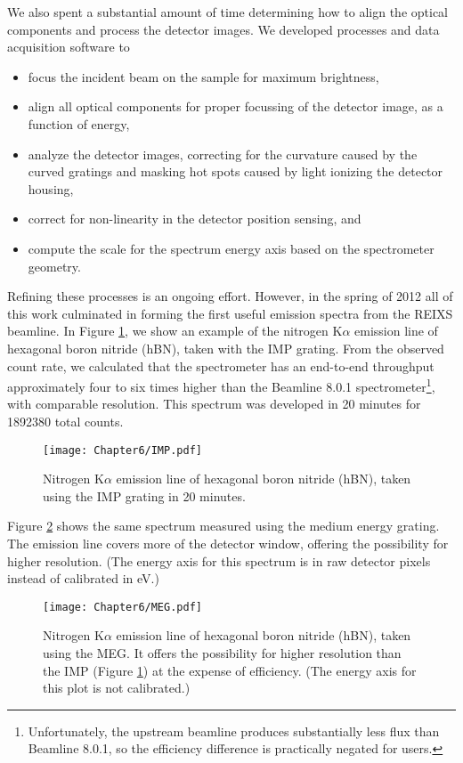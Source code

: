 We also spent a substantial amount of time determining how to align the optical components and process the detector images.  We developed processes and data acquisition software to
\begin{itemize}
\item focus the incident beam on the sample for maximum brightness,
\item align all optical components for proper focussing of the detector image, as a function of energy,
\item analyze the detector images, correcting for the curvature caused by the curved gratings and masking hot spots caused by light ionizing the detector housing,
\item correct for non-linearity in the detector position sensing, and
\item compute the scale for the spectrum energy axis based on the spectrometer geometry.
\end{itemize}

Refining these processes is an ongoing effort.  However, in the spring of 2012 all of this work culminated in forming the first useful emission spectra from the REIXS beamline.  In Figure \ref{impXES}, we show an example of the nitrogen K$\alpha$ emission line of hexagonal boron nitride (hBN), taken with the IMP grating.  From the observed count rate, we calculated that the spectrometer has an end-to-end throughput approximately four to six times higher than the Beamline 8.0.1 spectrometer\footnote{Unfortunately, the upstream beamline produces substantially less flux than Beamline 8.0.1, so the efficiency difference is practically negated for users.}, with comparable resolution.  This spectrum was developed in 20 minutes for 1892380 total counts.

\begin{figure}[htbp] %
   \centering
   \texttt{[image: Chapter6/IMP.pdf]} 
   \caption{Nitrogen K$\alpha$ emission line of hexagonal boron nitride (hBN), taken using the IMP grating in 20 minutes.}
   \label{impXES}
\end{figure}

Figure \ref{megXES} shows the same spectrum measured using the medium energy grating.  The emission line covers more of the detector window, offering the possibility for higher resolution.  (The energy axis for this spectrum is in raw detector pixels instead of calibrated in eV.)

\begin{figure}[htbp] %
   \centering
   \texttt{[image: Chapter6/MEG.pdf]} 
   \caption{Nitrogen K$\alpha$ emission line of hexagonal boron nitride (hBN), taken using the MEG.  It offers the possibility for higher resolution than the IMP (Figure \ref{impXES}) at the expense of efficiency.  (The energy axis for this plot is not calibrated.)}
   \label{megXES}
\end{figure}

